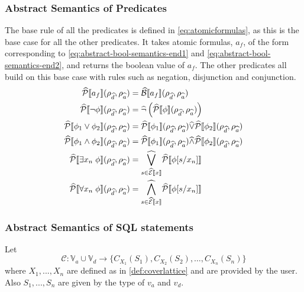 \subsubsection{Abstract Semantics of Predicates}
The base rule of all the predicates is defined in \autoref{eq:atomicformulas}, as this is the base case for all the other predicates.
It takes atomic formulas, $a_f$, of the form corresponding to \autoref{eq:abstract-bool-semantics-end1} and \ref{eq:abstract-bool-semantics-end2}, and returns the boolean value of $a_f$.
The other predicates all build on this base case with rules such as negation, disjunction and conjunction.
\begin{align}\label{eq:atomicformulas}
    \abspredsem{a_f}(\rho_{\ab{d}}, \rho_{\ab{a}}) &= \absboolsem{a_f}(\rho_{\ab{d}}, \rho_{\ab{a}}) \\
    \abspredsem{\neg \phi}(\rho_{\ab{d}}, \rho_{\ab{a}}) &= \ab{\neg} \left( \abspredsem{\phi}(\rho_{\ab{d}}, \rho_{\ab{a}}) \right) \\
    \abspredsem{\phi_1 \lor \phi_2}(\rho_{\ab{d}}, \rho_{\ab{a}}) &= \abspredsem{\phi_1}(\rho_{\ab{d}}, \rho_{\ab{a}}) \ab{\lor} \abspredsem{\phi_2}(\rho_{\ab{d}}, \rho_{\ab{a}}) \\
    \abspredsem{\phi_1 \land \phi_2}(\rho_{\ab{d}}, \rho_{\ab{a}}) &= \abspredsem{\phi_1}(\rho_{\ab{d}}, \rho_{\ab{a}}) \ab{\land} \abspredsem{\phi_2}(\rho_{\ab{d}}, \rho_{\ab{a}}) \\
    \abspredsem{\exists x_n \; \phi}(\rho_{\ab{d}}, \rho_{\ab{a}}) &= \underset{s \in \absexpsem{x}}{\ab{\bigvee}} \abspredsem{\phi[s/x_n]} \\
    \abspredsem{\forall x_n \; \phi}(\rho_{\ab{d}}, \rho_{\ab{a}}) &= \underset{s \in \absexpsem{x}}{\ab{\bigwedge}} \abspredsem{\phi[s/x_n]}
\end{align}

\subsubsection{Abstract Semantics of SQL statements}

Let
\begin{equation}
    \mathcal{C} : \mathbb{V}_a \cup \mathbb{V}_d \rightarrow \{ C_{X_1}(S_1), C_{X_2}(S_2), \dots, C_{X_n}(S_n) \}
\end{equation}
where $X_1,...,X_n$ are defined as in \autoref{def:coverlattice} and are provided by the user.
Also $S_1,...,S_n$ are given by the type of $v_a$ and $v_d$.

